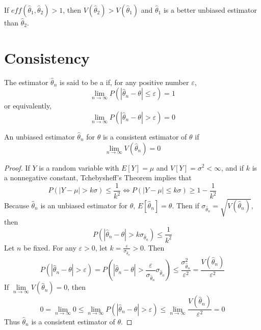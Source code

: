 \documentclass[12pt, a4paper, twoside, openright, titlepage]{book}
\begin{document}
If $eff(\hat{\theta}_1,\hat{\theta}_2) > 1$, then $V(\hat{\theta}_2) > V(\hat{\theta}_1)$ and $\hat{\theta}_1$ is a better unbiased estimator than $\hat{\theta}_2$. 


\section{\textsection Consistency}

\begin{defn}{}{}
    The estimator $\hat{\theta}_n$ is said to be a  if, for any positive number $\varepsilon$, \begin{equation*}
        \lim\limits_{n\rightarrow \infty}P(|\hat{\theta}_n-\theta| \leq \varepsilon) = 1
    \end{equation*}
    or equivalently, \begin{equation*}
        \lim\limits_{n\rightarrow \infty}P(|\hat{\theta}_n - \theta| > \varepsilon) = 0
    \end{equation*}
\end{defn}


\begin{thm}{}{}
    An unbiased estimator $\hat{\theta}_n$ for $\theta$ is a consistent estimator of $\theta$ if \begin{equation*}
        \lim\limits_{n\rightarrow \infty}V(\hat{\theta}_n) = 0
    \end{equation*}
\end{thm}
\begin{proof}{}{}
    If $Y$ is a random variable with $E[Y] = \mu$ and $V[Y] = \sigma^2 < \infty$, and if $k$ is a nonnegative constant, Tchebysheff's Theorem implies that \begin{equation*}
        P(|Y-\mu| > k\sigma) \leq \frac{1}{k^2} \iff P(|Y-\mu|\leq k\sigma) \geq 1 - \frac{1}{k^2}
    \end{equation*}
    Because $\hat{\theta}_n$ is an unbiased estimator for $\theta$, $E[\hat{\theta}_n] = \theta$. Then if $\sigma_{\hat{\theta}_n} = \sqrt{V(\hat{\theta}_n)}$, then \begin{equation*}
        P(|\hat{\theta}_n-\theta| > k\sigma_{\hat{\theta}_n}) \leq  \frac{1}{k^2}
    \end{equation*}
    Let $n$ be fixed. For any $\varepsilon > 0$, let $k = \frac{\varepsilon}{\sigma_{\hat{\theta}_n}} > 0$. Then \begin{equation*}
        P(|\hat{\theta}_n - \theta| > \varepsilon) = P(|\hat{\theta}_n - \theta| > \frac{\varepsilon}{\sigma_{\hat{\theta}_n}}\sigma_{\hat{\theta}_n}) \leq \frac{\sigma_{\hat{\theta}_n}^2}{\varepsilon^2} = \frac{V(\hat{\theta}_n)}{\varepsilon^2}
    \end{equation*}
    If $\lim\limits_{n\rightarrow \infty}V(\hat{\theta}_n) = 0$, then \begin{equation*}
        0 = \lim\limits_{n\rightarrow \infty} 0 \leq \lim\limits_{n\rightarrow \infty}P(|\hat{\theta}_n-\theta| > \varepsilon) \leq \lim\limits_{n\rightarrow \infty}\frac{V(\hat{\theta}_n)}{\varepsilon^2} = 0
    \end{equation*}
    Thus $\hat{\theta}_n$ is a consistent estimator of $\theta$.
\end{proof}
\end{document}
